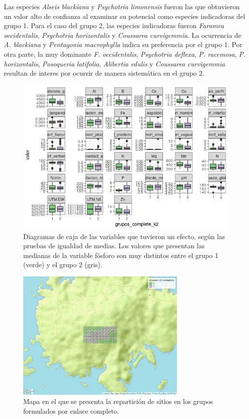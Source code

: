 \documentclass[11pt,]{article}
\begin{document}
Las especies \emph{Alseis blackiana} y \emph{Psychotria limonensis}
fueron las que obtuvieron un valor alto de confianza al examinar su
potencial como especies indicadoras del grupo 1. Para el caso del grupo
2, las especies indicadoras fueron \emph{Faramea occidentalis},
\emph{Psychotria horizontalis} y \emph{Coussarea curvigemmia}. La
ocurrencia de \emph{A. blackiana} y \emph{Pentagonia macrophylla} indica
su preferencia por el grupo 1. Por otra parte, la muy dominante \emph{F.
occidentalis}, \emph{Psychotria deflexa}, \emph{P. racemosa}, \emph{P.
horizontalis}, \emph{Posoqueria latifolia}, \emph{Alibertia edulis} y
\emph{Coussarea curvigemmia} resultan de interes por ocurrir de manera
sistemática en el grupo 2.

\begin{figure}
\centering
\includegraphics{diagrama_caja_igualdad_medias_complete.png}
\caption{Diagramas de caja de las variables que tuvieron un efecto,
según las pruebas de igualdad de medias. Los valores que presentan las
medianas de la variable fósforo son muy distintos entre el grupo 1
(verde) y el grupo 2 (gris).
\label{fig:diagrama_caja_igualdad_medias_complete}}
\end{figure}

\begin{figure}
\centering
\includegraphics[width=0.75000\textwidth]{mapa_complete_k2.png}
\caption{Mapa en el que se presenta la repartición de sitios en los
grupos formulados por enlace completo. \label{fig:mapa_complete_k2}}
\end{figure}
\end{document}
